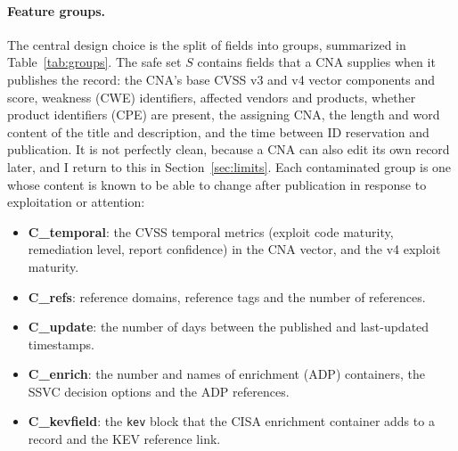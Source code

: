 \documentclass[conference,a4paper]{IEEEtran}
\begin{document}
\paragraph{Feature groups.} The central design choice is the split of fields into groups, summarized in Table~\ref{tab:groups}. The safe set $S$ contains fields that a CNA supplies when it publishes the record: the CNA's base CVSS v3 and v4 vector components and score, weakness (CWE) identifiers, affected vendors and products, whether product identifiers (CPE) are present, the assigning CNA, the length and word content of the title and description, and the time between ID reservation and publication. It is not perfectly clean, because a CNA can also edit its own record later, and I return to this in Section~\ref{sec:limits}. Each contaminated group is one whose content is known to be able to change after publication in response to exploitation or attention:
\begin{itemize}
\item \textbf{C\_temporal}: the CVSS temporal metrics (exploit code maturity, remediation level, report confidence) in the CNA vector, and the v4 exploit maturity.
\item \textbf{C\_refs}: reference domains, reference tags and the number of references.
\item \textbf{C\_update}: the number of days between the published and last-updated timestamps.
\item \textbf{C\_enrich}: the number and names of enrichment (ADP) containers, the SSVC decision options and the ADP references.
\item \textbf{C\_kevfield}: the \texttt{kev} block that the CISA enrichment container adds to a record and the KEV reference link.
\end{itemize}
\end{document}
